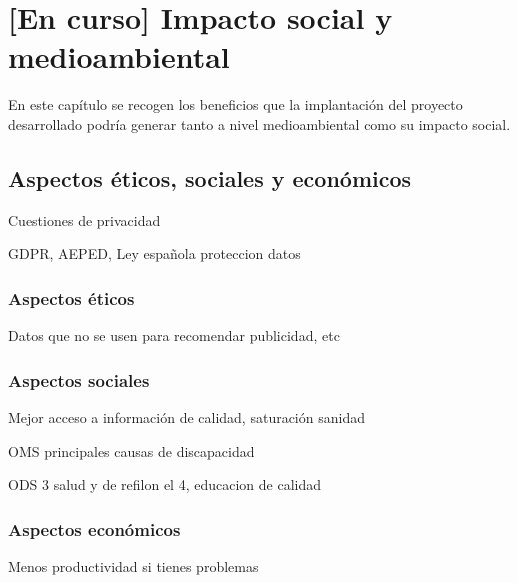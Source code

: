 \chapter{[En curso] Impacto social y medioambiental}
\label{chapter:aspectos}





En este capítulo se recogen los beneficios que la implantación del proyecto desarrollado podría generar tanto a nivel medioambiental como su impacto social.




\section{Aspectos éticos, sociales y económicos}

Cuestiones de privacidad

GDPR, AEPED, Ley española proteccion datos

\subsection{Aspectos éticos}

Datos que no se usen para recomendar publicidad, etc

\subsection{Aspectos sociales}

Mejor acceso a información de calidad, saturación sanidad

OMS principales causas de discapacidad


ODS 3 salud y de refilon el 4, educacion de calidad

\subsection{Aspectos económicos}

Menos productividad si tienes problemas

    
